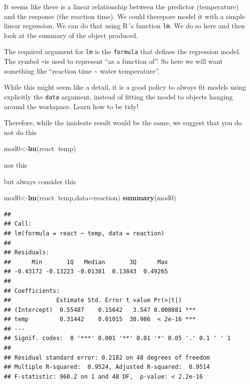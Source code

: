 \documentclass[
]{book}
\newenvironment{Shaded}{\begin{snugshade}}{\end{snugshade}}
\newcommand{\DataTypeTok}[1]{\textcolor[rgb]{0.13,0.29,0.53}{#1}}
\newcommand{\KeywordTok}[1]{\textcolor[rgb]{0.13,0.29,0.53}{\textbf{#1}}}
\newcommand{\NormalTok}[1]{#1}
\newcommand{\OperatorTok}[1]{\textcolor[rgb]{0.81,0.36,0.00}{\textbf{#1}}}
\begin{document}
It seems like there is a linear relationship between the predictor (temperature) and the response (the reaction time). We could therepore model it with a simple linear regression. We can do that using R´s function \texttt{lm}. We do so here and then look at the summary of the object produced.

The required argument for \texttt{lm} is the \texttt{formula} that defines the regression model. The symbol \texttt{\textasciitilde{}}is used to represent ``as a function of''. So here we will want something like ``reaction time \textasciitilde{} water temperature''.

While this might seem like a detail, it is a good policy to always fit models using explicitly the \texttt{data} argument, instead of fitting the model to objects hanging around the workspace. Learn how to be tidy!

Therefore, while the imideate result would be the same, we suggest that you do not do this

\begin{Shaded}
\begin{Highlighting}[]
\NormalTok{mod0<-}\KeywordTok{lm}\NormalTok{(react}\OperatorTok{~}\NormalTok{temp)}
\end{Highlighting}
\end{Shaded}

nor this

\begin{Shaded}
\end{Shaded}

but always consider this

\begin{Shaded}
\begin{Highlighting}[]
\NormalTok{mod0<-}\KeywordTok{lm}\NormalTok{(react}\OperatorTok{~}\NormalTok{temp,}\DataTypeTok{data=}\NormalTok{reaction)}
\KeywordTok{summary}\NormalTok{(mod0)}
\end{Highlighting}
\end{Shaded}

\begin{verbatim}
## 
## Call:
## lm(formula = react ~ temp, data = reaction)
## 
## Residuals:
##      Min       1Q   Median       3Q      Max 
## -0.43172 -0.13223 -0.01381  0.13843  0.49265 
## 
## Coefficients:
##             Estimate Std. Error t value Pr(>|t|)    
## (Intercept)  0.55487    0.15642   3.547 0.000881 ***
## temp         0.31442    0.01015  30.986  < 2e-16 ***
## ---
## Signif. codes:  0 '***' 0.001 '**' 0.01 '*' 0.05 '.' 0.1 ' ' 1
## 
## Residual standard error: 0.2182 on 48 degrees of freedom
## Multiple R-squared:  0.9524,	Adjusted R-squared:  0.9514 
## F-statistic: 960.2 on 1 and 48 DF,  p-value: < 2.2e-16
\end{verbatim}
\end{document}
